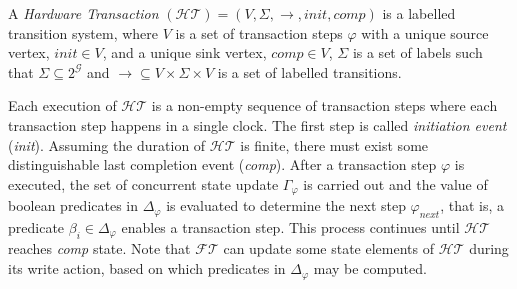 \documentclass[sigconf]{acmart}
\begin{document}
A {\em Hardware Transaction} $(\mathcal{HT}) = (V, \Sigma, \rightarrow, init,
comp)$ is a labelled transition system, where $V$ is a set of transaction steps
$\varphi$ with a unique source vertex, $init \in V$, and a unique sink vertex, 
$comp \in V$, $\Sigma$ is a set of labels such that $\Sigma \subseteq
2^{\mathcal{G}}$ and $\rightarrow \subseteq V \times \Sigma \times V$ is a set of labelled
transitions.

Each execution of $\mathcal{HT}$ is a non-empty 
sequence of transaction steps where each transaction step 
happens in a single clock. The first step is called {\em initiation event}
(\textit{init}). Assuming the duration of $\mathcal{HT}$ is finite, 
there must exist some distinguishable last completion event (\textit{comp}). 
After a transaction step $\varphi$ is executed, the set of concurrent state
update $\Gamma_{\varphi}$ is carried out and the value of boolean predicates
in $\Delta_{\varphi}$ is evaluated to determine the next step
$\varphi_{next}$, that is, a predicate $\beta_i \in \Delta_{\varphi}$
enables a transaction step.  This process continues until $\mathcal{HT}$
reaches \textit{comp} state.  Note that $\mathcal{FT}$ can update some state
elements of $\mathcal{HT}$ during its write action, based on which
predicates in $\Delta_{\varphi}$ may be computed. 
\end{document}
